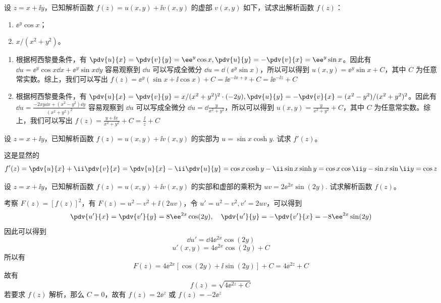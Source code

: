
\begin{question}
设 \(z = x + \ii y\)，已知解析函数 \(f(z)=u(x,y) + \ii v(x,y)\) 的虚部 \(v(x,y)\) 如下，试求出解析函数 \(f(z)\)：
\begin{enumerate}
    \item \(\ee^y \cos x\)；
    \item \(x/(x^2+y^2)\)。
\end{enumerate}
\begin{solution}
\begin{enumerate}
    \item 根据柯西黎曼条件，有 \(\pdv{u}{x} = \pdv{v}{y} = \ee^y \cos x, \pdv{u}{y}= -\pdv{v}{x}=\ee^y \sin x \)。因此有 \( \dd{u} = \ee^y \cos x \dd{x} + \ee^y \sin x \dd{y} \) 容易观察到 \(\dd{u}\) 可以写成全微分 \(\dd{u} = \dd{(\ee^y \sin x)}\)，所以可以得到 \(u(x,y)= \ee^y \sin x +C\)，其中 \(C\) 为任意常实数。综上，我们可以写出 \( f(z)=\ee^y (\sin x + \ii  \cos x) + C = \ii \ee^{-\ii x +y} + C=\ii \ee^{-\ii z} + C  \)
    \item 根据柯西黎曼条件，有 \(\pdv{u}{x}=\pdv{v}{y}=x/(x^2+y^2)^2 \cdot (-2y), \pdv{u}{y}=-\pdv{v}{x}=(x^2-y^2)/(x^2+y^2)^2\)。因此有\( \dd{u} = \frac{-2x y \dd{x} +(x^2 - y^2) \dd{y}}{(x^2+y^2)^2} \) 容易观察到 \(\dd{u}\) 可以写成全微分 \(\dd{u}=\dd{\frac{y}{x^2 + y^2}}\)，所以可以得到 \(u(x,y)=\frac{y}{x^2+y^2}+C\)，其中 \(C\) 为任意常实数。综上，我们可以写出 \( f(z)=\frac{y+\ii x}{x^2+y^2} + C=\frac{\ii}{z} + C \)
\end{enumerate}
\end{solution}
\end{question}

\begin{question}
设 \(z = x+\ii y\)，已知解析函数 \(f(z)=u(x,y)+\ii v(x,y)\) 的实部为 \( u = \sin x \cosh y. \)
试求 \(f'(z)\)。
\begin{solution}
这是显然的 \[
f'(z) = \pdv{u}{x} + \ii \pdv{v}{x} = \pdv{u}{x} -\ii \pdv{u}{y}
= \cos x \cosh y -\ii \sin x \sinh y
= \cos x \cos \ii y - \sin x \sin \ii y
= \cos z
\]
\end{solution}
\end{question}

\begin{question}
设 \(z=x+\ii y\)，已知解析函数 \(f(z)=u(x,y)+\ii v(x,y)\) 的实部和虚部的乘积为 \( u v = 2\ee^{2x} \sin(2y). \)
试求解析函数 \(f(z)\)。
\begin{solution}
考察 \(F(z)= [f(z)]^2\)，有 \(F(z)=u^2 - v^2 + \ii (2u v)\)，令 \(u'=u^2-v^2,v'=2u v\)，可以得到 \[
\pdv{u'}{x}=\pdv{v'}{y}=8 \ee ^{2x} \cos (2y), \quad \pdv{u'}{y}=-\pdv{v'}{x}=-8\ee^{2x} \sin(2y)
\]
因此可以得到 \[
\dd{u'}=\dd{4\ee^{2x} \cos (2y)}
\]
\[
u'(x,y)=4 \ee^{2x} \cos(2y) + C
\]
所以有 \[
F(z)= 4 \ee^{2x} [\cos(2y) + \ii \sin(2y)] + C=4 \ee ^{2z} + C
\]
故有 \[
f(z) =\sqrt{4 \ee^{2z} + C}
\]
若要求 \(f(z)\) 解析，那么 \(C=0\)，故有 \( f(z) =2\ee^{z}\) 或 \(f(z) = -2\ee^z \)
\end{solution}
\end{question}

